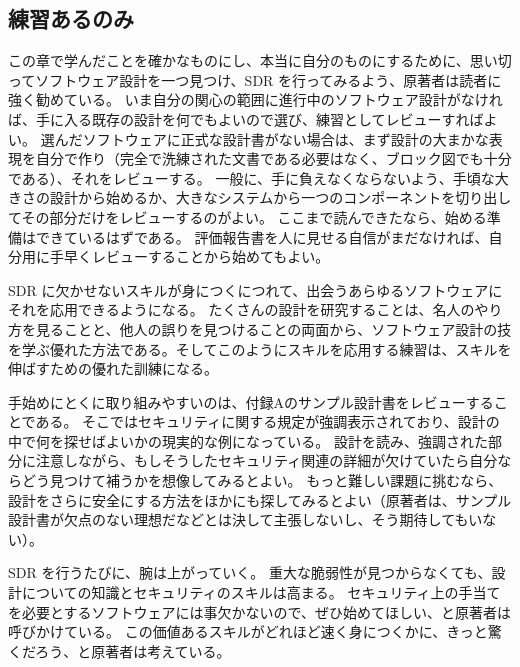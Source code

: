 \documentclass[uplatex]{jsarticle}
\begin{document}
\subsection{練習あるのみ}

この章で学んだことを確かなものにし、本当に自分のものにするために、思い切ってソフトウェア設計を一つ見つけ、SDR を行ってみるよう、原著者は読者に強く勧めている。
いま自分の関心の範囲に進行中のソフトウェア設計がなければ、手に入る既存の設計を何でもよいので選び、練習としてレビューすればよい。
選んだソフトウェアに正式な設計書がない場合は、まず設計の大まかな表現を自分で作り（完全で洗練された文書である必要はなく、ブロック図でも十分である）、それをレビューする。
一般に、手に負えなくならないよう、手頃な大きさの設計から始めるか、大きなシステムから一つのコンポーネントを切り出してその部分だけをレビューするのがよい。
ここまで読んできたなら、始める準備はできているはずである。
評価報告書を人に見せる自信がまだなければ、自分用に手早くレビューすることから始めてもよい。

SDR に欠かせないスキルが身につくにつれて、出会うあらゆるソフトウェアにそれを応用できるようになる。
たくさんの設計を研究することは、名人のやり方を見ることと、他人の誤りを見つけることの両面から、ソフトウェア設計の技を学ぶ優れた方法である。そしてこのようにスキルを応用する練習は、スキルを伸ばすための優れた訓練になる。

手始めにとくに取り組みやすいのは、付録Aのサンプル設計書をレビューすることである。
そこではセキュリティに関する規定が強調表示されており、設計の中で何を探せばよいかの現実的な例になっている。
設計を読み、強調された部分に注意しながら、もしそうしたセキュリティ関連の詳細が欠けていたら自分ならどう見つけて補うかを想像してみるとよい。
もっと難しい課題に挑むなら、設計をさらに安全にする方法をほかにも探してみるとよい（原著者は、サンプル設計書が欠点のない理想だなどとは決して主張しないし、そう期待してもいない）。

SDR を行うたびに、腕は上がっていく。
重大な脆弱性が見つからなくても、設計についての知識とセキュリティのスキルは高まる。
セキュリティ上の手当てを必要とするソフトウェアには事欠かないので、ぜひ始めてほしい、と原著者は呼びかけている。
この価値あるスキルがどれほど速く身につくかに、きっと驚くだろう、と原著者は考えている。

\newpage

\end{document}
